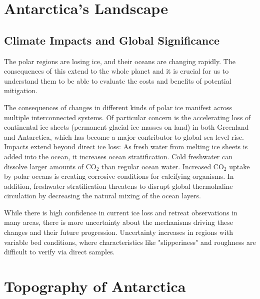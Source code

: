 \chapter{Antarctica's Landscape}\label{why}
\section*{Climate Impacts and Global Significance}

The polar regions are losing ice, and their oceans are changing rapidly\cite{O_C_in_changingClimate}. The consequences of this extend to the whole planet and it is crucial for us to understand them to be able to evaluate the costs and benefits of potential mitigation. 

The consequences of changes in different kinds of polar ice manifest across multiple interconnected systems. Of particular concern is the accelerating loss of continental ice sheets (permanent glacial ice masses on land) in both Greenland and Antarctica, which has become a major contributor to global sea level rise\cite{O_C_in_changingClimate}. Impacts extend beyond direct ice loss: As fresh water from melting ice sheets is added into the ocean, it increases ocean stratification. Cold freshwater can dissolve larger amounts of $\mathrm{CO_2}$ than regular ocean water. Increased $\mathrm{CO_2}$ uptake by polar oceans is creating corrosive conditions for calcifying organisms\cite{O_C_in_changingClimate}. In addition, freshwater stratification threatens to disrupt global thermohaline circulation\cite{Jacobs_2004} by decreasing the natural mixing of the ocean layers.
 
While there is high confidence in current ice loss and retreat observations in many areas, there is more uncertainty about the mechanisms driving these changes and their future progression\cite{Kemper_2021}. Uncertainty increases in regions with variable bed conditions, where characteristics like "slipperiness" and roughness are difficult to verify via direct samples.



\chapter{Topography of Antarctica}\label{review}

